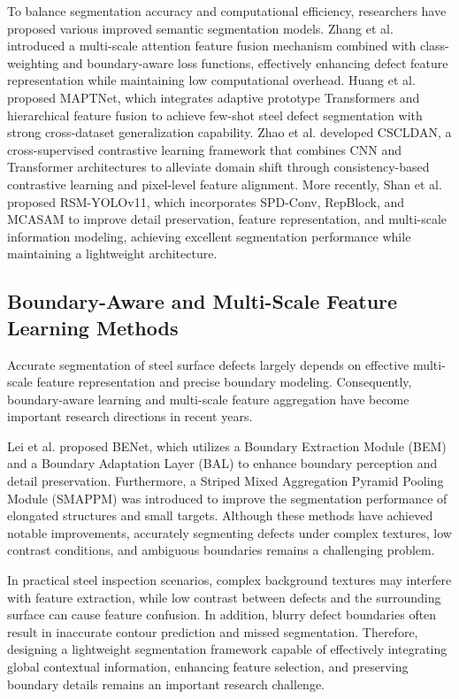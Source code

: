 \documentclass[sn-basic]{sn-jnl}
\theoremstyle{thmstyleone}%
\theoremstyle{thmstyletwo}%
\theoremstyle{thmstylethree}%
\begin{document}
To balance segmentation accuracy and computational efficiency, researchers have proposed various improved semantic segmentation models. Zhang et al. \cite{Zhang2023Semantic} introduced a multi-scale attention feature fusion mechanism combined with class-weighting and boundary-aware loss functions, effectively enhancing defect feature representation while maintaining low computational overhead. Huang et al. \cite{Huang2025Multiscale} proposed MAPTNet, which integrates adaptive prototype Transformers and hierarchical feature fusion to achieve few-shot steel defect segmentation with strong cross-dataset generalization capability. Zhao et al. \cite{Zhao2025Cross} developed CSCLDAN, a cross-supervised contrastive learning framework that combines CNN and Transformer architectures to alleviate domain shift through consistency-based contrastive learning and pixel-level feature alignment. More recently, Shan et al. \cite{Shan2025RSM} proposed RSM-YOLOv11, which incorporates SPD-Conv, RepBlock, and MCASAM to improve detail preservation, feature representation, and multi-scale information modeling, achieving excellent segmentation performance while maintaining a lightweight architecture.
\subsection{Boundary-Aware and Multi-Scale Feature Learning Methods}
Accurate segmentation of steel surface defects largely depends on effective multi-scale feature representation and precise boundary modeling. Consequently, boundary-aware learning and multi-scale feature aggregation have become important research directions in recent years.

Lei et al. \cite{Lei2025BENet} proposed BENet, which utilizes a Boundary Extraction Module (BEM) and a Boundary Adaptation Layer (BAL) to enhance boundary perception and detail preservation. Furthermore, a Striped Mixed Aggregation Pyramid Pooling Module (SMAPPM) was introduced to improve the segmentation performance of elongated structures and small targets. Although these methods have achieved notable improvements, accurately segmenting defects under complex textures, low contrast conditions, and ambiguous boundaries remains a challenging problem.

In practical steel inspection scenarios, complex background textures may interfere with feature extraction, while low contrast between defects and the surrounding surface can cause feature confusion\cite{Krithika2022Review}. In addition, blurry defect boundaries often result in inaccurate contour prediction and missed segmentation. Therefore, designing a lightweight segmentation framework capable of effectively integrating global contextual information, enhancing feature selection, and preserving boundary details remains an important research challenge.
    
\end{document}
